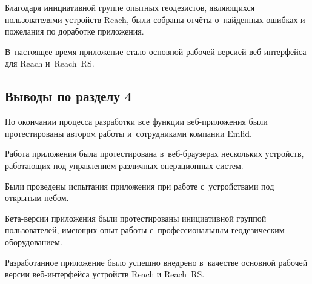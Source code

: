 Благодаря инициативной группе опытных геодезистов, являющихся пользователями устройств Reach, были собраны отчёты о~найденных ошибках и пожелания по доработке приложения.

В~настоящее время приложение стало основной рабочей версией веб-интерфейса для Reach и~Reach~RS.



\subsection{Выводы по разделу 4}

\begin{dashitemize}
  \item По окончании процесса разработки все функции веб-приложения были протестированы автором работы и~сотрудниками компании Emlid.
  \item Работа приложения была протестирована в~веб-браузерах нескольких устройств, работающих под управлением различных операционных систем.
  \item Были проведены испытания приложения при работе с~устройствами под открытым небом.
  \item Бета-версии приложения были протестированы инициативной группой пользователей, имеющих опыт работы с~профессиональным геодезическим оборудованием.
  \item Разработанное приложение было успешно внедрено в~качестве основной рабочей версии веб-интерфейса устройств Reach и Reach~RS.
\end{dashitemize}

\newpage